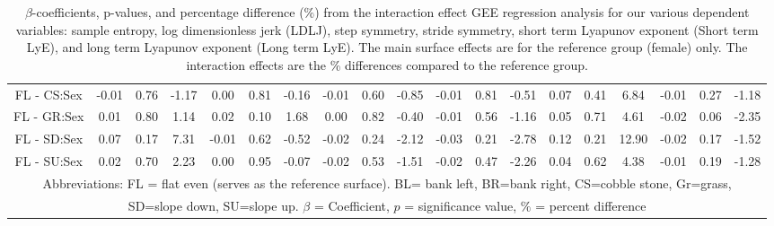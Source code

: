 \documentclass[authoryear,preprint,review,12pt]{elsarticle}
\begin{document}
{\begin{landscape}
\begin{table}[t]
\begin{tabular}{cccc|ccc|ccc|ccc|ccc|ccc}
        FL - CS:Sex	&	-0.01&	0.76&	-1.17&	0.00&	0.81&	-0.16&	-0.01&	0.60&	-0.85&	-0.01&	0.81&	-0.51&	0.07&	0.41&	6.84&	-0.01&	0.27&	-1.18\\
        FL - GR:Sex	&	0.01&	0.80&	1.14&	0.02&	0.10&	1.68&	0.00&	0.82&	-0.40&	-0.01&	0.56&	-1.16&	0.05&	0.71&	4.61&	-0.02&	0.06&	-2.35\\
        FL - SD:Sex	&	0.07&	0.17&	7.31&	-0.01&	0.62&	-0.52&	-0.02&	0.24&	-2.12&	-0.03&	0.21&	-2.78&	0.12&	0.21&	12.90&	-0.02&	0.17&	-1.52\\
        FL - SU:Sex &	0.02&	0.70&	2.23&	0.00&	0.95&	-0.07&	-0.02&	0.53&	-1.51&	-0.02&	0.47&	-2.26&	0.04&	0.62&	4.38&	-0.01&	0.19&	-1.28\\ \hline
        \multicolumn{19}{c}{\scriptsize Abbreviations: FL = flat even (serves as the reference surface). BL= bank left, BR=bank right, CS=cobble stone, Gr=grass, } \\
         \multicolumn{19}{c}{\scriptsize SD=slope down, SU=slope up. $\beta$ = Coefficient, $p$ = significance value, $\%$ = percent difference}
    \end{tabular}
    \caption{$\beta$-coefficients, p-values, and percentage difference ($\%$) from the interaction effect GEE regression analysis for our various dependent variables: sample entropy, log dimensionless jerk (LDLJ), step symmetry, stride symmetry, short term Lyapunov exponent (Short term LyE), and long term Lyapunov exponent (Long term LyE). The main surface effects are for the reference group (female) only. The interaction effects are the \% differences compared to the reference group.}
    \label{tab:GEE-perc}
\end{table}

    \end{landscape}
    \clearpage%
}







\end{document}
